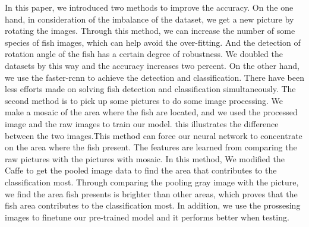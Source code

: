 \documentclass[conference]{IEEEtran}
\begin{document}
In this paper, we introduced two methods to improve the accuracy. On the one hand, in consideration of the imbalance of the dataset, we get a new picture by rotating the images. Through this method, we can increase the number of some species of fish images, which can help avoid the over-fitting. And the detection of rotation angle of the fish has a certain degree of robustness. We doubled the datasets by this way and the accuracy increases two percent. On the other hand, we use the faster-rcnn to achieve the detection and classification. There have been less efforts made on solving fish detection and classification simultaneously. 
The second method is to pick up some pictures to do some image processing. We make a mosaic of the area where the fish are located, and we  used the processed image and the raw images to train our model. this illustrates the difference between the two images.This method can force our neural network to concentrate on the area where the fish present. The features are learned from comparing the raw pictures with the pictures with mosaic. In this method, We modified the Caffe to get the pooled image data to find the area that contributes to the classification most. Through comparing the pooling gray image with the picture, we find the area fish presents is brighter than other areas, which proves that the fish area contributes to the classification most. In addition, we use the prossesing images to finetune our pre-trained model and it performs better when testing. 
\end{document}
